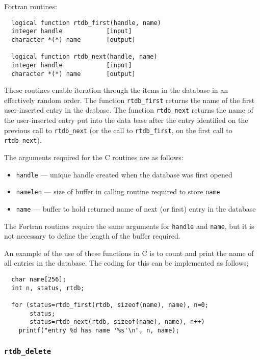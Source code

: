 Fortran routines:

\begin{verbatim}
  logical function rtdb_first(handle, name)
  integer handle            [input]
  character *(*) name       [output]

  logical function rtdb_next(handle, name)
  integer handle            [input]
  character *(*) name       [output]
\end{verbatim}
These routines enable iteration through the items in the database in
an effectively random order.  The function {\tt rtdb\_first} returns
the name of the first user-inserted entry in the datbase.  The function
{\tt rtdb\_next} returns the name of the user-inserted entry put into the
data base after the entry identified on the previous call to {\tt rtdb\_next}
(or the call to {\tt rtdb\_first}, on the first call to {\tt rtdb\_next}).

The arguments required for the C routines are as follows:

\begin{itemize}

\item {\tt handle} --- unique handle created when the database was first opened
\item {\tt namelen} ---  size of buffer in calling routine required to store {\tt name}
\item {\tt name} --- buffer to hold returned name of next (or first) entry in the database 
\end{itemize}

The Fortran routines require the same arguments for {\tt handle} and {\tt name}, but it is 
not necessary to define the length of the buffer required.

An example of the use of these functions in C is to count and print the name of all
entries  in the database.  The coding for this can be implemented as follows;

\begin{verbatim}
  char name[256];
  int n, status, rtdb;

  for (status=rtdb_first(rtdb, sizeof(name), name), n=0;
       status;
       status=rtdb_next(rtdb, sizeof(name), name), n++) 
    printf("entry %d has name '%s'\n", n, name);
\end{verbatim}

\subsubsection{{\tt rtdb\_delete}}

